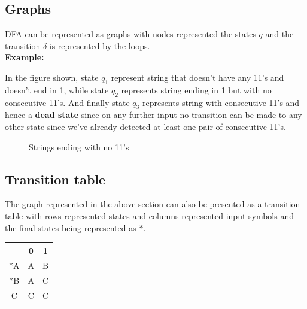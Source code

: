 \documentclass{report}
\begin{document}
    \subsection{Graphs}
    DFA can be represented as graphs with nodes represented the states $q$ and the transition $\delta$ is represented by the loops. \\ \textbf{Example:}\par
    In the figure shown, state $q_1$ represent string that doesn't have any 11's and doesn't end in 1, while state $q_2$ represents string ending in 1 but with no consecutive 11's. And finally state $q_3$ represents string with consecutive 11's and hence a \textbf{dead state} since on any further input no transition can be made to any other state since we've already detected at least one pair of consecutive 11's. 
    \begin{figure}[ht] 
    \centering 
    \caption{Strings ending with no 11's}
    \label{fig:my_label}
    \end{figure}

\subsection{Transition table}
The graph represented in the above section can also be presented as a transition table with rows represented states and columns represented input symbols and the final states being represented as $*$.

    \begin{center}
    \begin{tabular}{||c c c||} 
     \hline
      & 0 & 1 \\ [0.5ex] 
    \hline\hline
    $*$A & A & B \\ 
    \hline
    $*$B & A & C\\
    \hline
    C & C & C \\ [1ex]
    \hline
    \end{tabular}
    \end{center}
\end{document}
